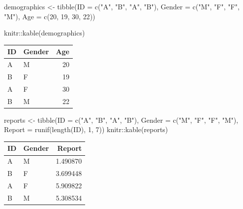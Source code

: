 \documentclass[
]{book}
\newenvironment{Shaded}{\begin{snugshade}}{\end{snugshade}}
\newcommand{\AttributeTok}[1]{\textcolor[rgb]{0.77,0.63,0.00}{#1}}
\newcommand{\DecValTok}[1]{\textcolor[rgb]{0.00,0.00,0.81}{#1}}
\newcommand{\FunctionTok}[1]{\textcolor[rgb]{0.00,0.00,0.00}{#1}}
\newcommand{\NormalTok}[1]{#1}
\newcommand{\OtherTok}[1]{\textcolor[rgb]{0.56,0.35,0.01}{#1}}
\newcommand{\SpecialCharTok}[1]{\textcolor[rgb]{0.00,0.00,0.00}{#1}}
\newcommand{\StringTok}[1]{\textcolor[rgb]{0.31,0.60,0.02}{#1}}
\begin{document}
\begin{Shaded}
\begin{Highlighting}[]
\NormalTok{demographics }\OtherTok{\textless{}{-}} \FunctionTok{tibble}\NormalTok{(}\AttributeTok{ID =} \FunctionTok{c}\NormalTok{(}\StringTok{"A"}\NormalTok{, }\StringTok{"B"}\NormalTok{, }\StringTok{"A"}\NormalTok{, }\StringTok{"B"}\NormalTok{),}
                       \AttributeTok{Gender =} \FunctionTok{c}\NormalTok{(}\StringTok{"M"}\NormalTok{, }\StringTok{"F"}\NormalTok{, }\StringTok{"F"}\NormalTok{, }\StringTok{"M"}\NormalTok{),}
                       \AttributeTok{Age =} \FunctionTok{c}\NormalTok{(}\DecValTok{20}\NormalTok{, }\DecValTok{19}\NormalTok{, }\DecValTok{30}\NormalTok{, }\DecValTok{22}\NormalTok{))}

\NormalTok{knitr}\SpecialCharTok{::}\FunctionTok{kable}\NormalTok{(demographics)}
\end{Highlighting}
\end{Shaded}

\begin{tabular}{l|l|r}
\hline
ID & Gender & Age\\
\hline
A & M & 20\\
\hline
B & F & 19\\
\hline
A & F & 30\\
\hline
B & M & 22\\
\hline
\end{tabular}

\begin{Shaded}
\begin{Highlighting}[]
\NormalTok{reports }\OtherTok{\textless{}{-}} \FunctionTok{tibble}\NormalTok{(}\AttributeTok{ID =} \FunctionTok{c}\NormalTok{(}\StringTok{"A"}\NormalTok{, }\StringTok{"B"}\NormalTok{, }\StringTok{"A"}\NormalTok{, }\StringTok{"B"}\NormalTok{),}
                  \AttributeTok{Gender =} \FunctionTok{c}\NormalTok{(}\StringTok{"M"}\NormalTok{, }\StringTok{"F"}\NormalTok{, }\StringTok{"F"}\NormalTok{, }\StringTok{"M"}\NormalTok{),}
                  \AttributeTok{Report =} \FunctionTok{runif}\NormalTok{(}\FunctionTok{length}\NormalTok{(ID), }\DecValTok{1}\NormalTok{, }\DecValTok{7}\NormalTok{))}
\NormalTok{knitr}\SpecialCharTok{::}\FunctionTok{kable}\NormalTok{(reports)}
\end{Highlighting}
\end{Shaded}

\begin{tabular}{l|l|r}
\hline
ID & Gender & Report\\
\hline
A & M & 1.490870\\
\hline
B & F & 3.699448\\
\hline
A & F & 5.909822\\
\hline
B & M & 5.308534\\
\hline
\end{tabular}
\end{document}

